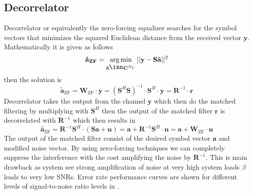 \subsection{Decorrelator}
Decorrelator or equivalently the zero-forcing equalizer searches for the symbol vectors that minimizes the squared Euclidean distance from the received vector $\mathrm{\mathbf{y}}$. Mathematically it is given as follows
\begin{equation}
\mathrm{\mathbf{\hat{a}_{ZF}}}=\argmin_{\mathrm{\mathbf{\tilde{a}}}\in\mathrm{\mathbf{C}}^{N_U}}\vert\vert\mathrm{\mathbf{y}}-\mathrm{\mathbf{S}}\mathrm{\mathbf{\tilde{a}}}\vert\vert^2
\end{equation}
then the solution is
\begin{equation}
\mathrm{\mathbf{\tilde{a}}_{ZF}}=\mathrm{\mathbf{W}_{ZF}} \cdot \mathrm{\mathbf{y}} = (\mathrm{\mathbf{S}}^H\mathrm{\mathbf{S}})^{-1} \cdot \mathrm{\mathbf{S}}^H\cdot\mathrm{\mathbf{y}}=\mathrm{\mathbf{R}}^{-1}\cdot\mathrm{\mathbf{r}}
\end{equation}
Decorrelator takes the output from the channel $\mathrm{\mathbf{y}}$ which then do the matched filtering by multiplying with $\mathrm{\mathbf{S}}^H$ then the output of the matched filter $\mathrm{\mathbf{r}}$ is decorrelated with $\mathrm{\mathbf{R}}^{-1}$ which then results in
\begin{equation}
\mathrm{\mathbf{\hat{a}}_{ZF}}=\mathrm{\mathbf{R}}^{-1}\mathrm{\mathbf{S}}^H\cdot(\mathrm{\mathbf{S}}\mathrm{\mathbf{a}}+\mathrm{\mathbf{n}})=\mathrm{\mathbf{a}}+\mathrm{\mathbf{R}}^{-1}\mathrm{\mathbf{S}}^H\cdot\mathrm{\mathbf{n}}=\mathrm{\mathbf{a}}+\mathrm{\mathbf{W}_{ZF}}\cdot\mathrm{\mathbf{n}}
\end{equation}
The output of the matched filter consist of the desired symbol vector $\mathrm{\mathbf{a}}$ and modified noise vector. By using zero-forcing techniques we can completely suppress the interference with the cost amplifying the noise by $\mathrm{\mathbf{R}}^{-1}$. This is main drawback as system see strong amplification of noise at very high system loads $\beta$ leads to very low SNRs. Error rate performance curves are shown for different levels of signal-to-noise ratio levels in \cite{K05}.
